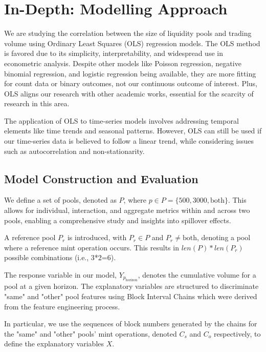 \documentclass{article}
\begin{document}
\section{\textbf{In-Depth: Modelling Approach}}

We are studying the correlation between the size of liquidity pools and trading volume using Ordinary Least Squares (OLS) regression models. The OLS method is favored due to its simplicity, interpretability, and widespread use in econometric analysis. Despite other models like Poisson regression, negative binomial regression, and logistic regression being available, they are more fitting for count data or binary outcomes, not our continuous outcome of interest. Plus, OLS aligns our research with other academic works\cite{Miori2023}, essential for the scarcity of research in this area.

The application of OLS to time-series models involves addressing temporal elements like time trends and seasonal patterns. However, OLS can still be used if our time-series data is believed to follow a linear trend, while considering issues such as autocorrelation and non-stationarity.

\subsection{\textbf{Model Construction and Evaluation}}

We define a set of pools, denoted as \(P\), where \(p \in P=\{500,3000,\text{both}\}\). This allows for individual, interaction, and aggregate metrics within and across two pools, enabling a comprehensive study and insights into spillover effects. 

A reference pool \(P_r\) is introduced, with \(P_r \in P\) and \(P_r \neq \text{both}\), denoting a pool where a reference mint operation occurs. This results in \(len(P) * len(P_r)\) possible combinations (i.e., 3*2=6).

The response variable in our model, \(Y_{p_{\text{horizon}}}\), denotes the cumulative volume for a pool at a given horizon. The explanatory variables are structured to discriminate "same" and "other" pool features using Block Interval Chains which were derived from the feature engineering process.

In particular, we use the sequences of block numbers generated by the chains for the "same" and "other" pools' mint operations, denoted \(C_s\) and \(C_o\) respectively, to define the explanatory variables \(X\). 
\end{document}
